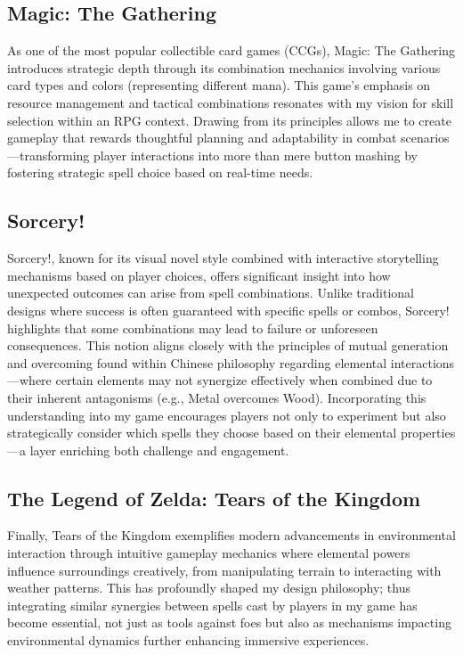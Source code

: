 \documentclass[10pt,twocolumn]{article}
\begin{document}
\subsection{Magic: The Gathering}
As one of the most popular collectible card games (CCGs), Magic: The Gathering introduces strategic depth through its combination mechanics involving various card types and colors (representing different mana). This game's emphasis on resource management and tactical combinations resonates with my vision for skill selection within an RPG context. Drawing from its principles allows me to create gameplay that rewards thoughtful planning and adaptability in combat scenarios—transforming player interactions into more than mere button mashing by fostering strategic spell choice based on real-time needs.

\subsection{Sorcery!}
Sorcery!, known for its visual novel style combined with interactive storytelling mechanisms based on player choices, offers significant insight into how unexpected outcomes can arise from spell combinations. Unlike traditional designs where success is often guaranteed with specific spells or combos, Sorcery! highlights that some combinations may lead to failure or unforeseen consequences. This notion aligns closely with the principles of mutual generation and overcoming found within Chinese philosophy regarding elemental interactions—where certain elements may not synergize effectively when combined due to their inherent antagonisms (e.g., Metal overcomes Wood). Incorporating this understanding into my game encourages players not only to experiment but also strategically consider which spells they choose based on their elemental properties—a layer enriching both challenge and engagement.

\subsection{The Legend of Zelda: Tears of the Kingdom}
Finally, Tears of the Kingdom exemplifies modern advancements in environmental interaction through intuitive gameplay mechanics where elemental powers influence surroundings creatively, from manipulating terrain to interacting with weather patterns. This has profoundly shaped my design philosophy; thus integrating similar synergies between spells cast by players in my game has become essential, not just as tools against foes but also as mechanisms impacting environmental dynamics further enhancing immersive experiences.
\end{document}
